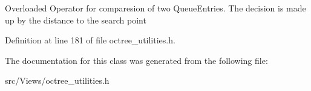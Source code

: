 Overloaded Operator for comparesion of two QueueEntries. The decision is made up by the distance to the search point 

Definition at line 181 of file octree\_\-utilities.h.

The documentation for this class was generated from the following file:\begin{CompactItemize}
\item 
src/Views/octree\_\-utilities.h\end{CompactItemize}
